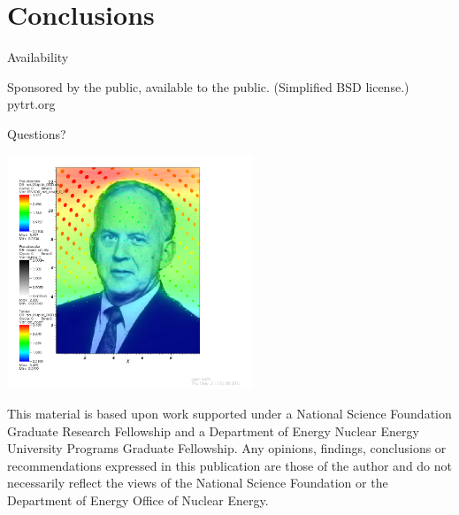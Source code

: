 \documentclass{beamer}
\begin{document}
\section{Conclusions}
\begin{frame}{Availability}

\begin{center}
Sponsored by the public, available to the public. (Simplified BSD license.)
\vspace{.5in}
  \Huge pytrt.org
\end{center}

\end{frame}

\begin{frame}{Questions?}

{\centering\includegraphics[height=2.75in]{larsen}\par}
\vspace{-\baselineskip}
{\setlength{\baselineskip}{-\baselineskip} \tiny 
This material is based upon work supported under a National Science Foundation
Graduate Research Fellowship and a Department of Energy Nuclear Energy
University Programs Graduate Fellowship. Any opinions, findings, conclusions or
recommendations expressed in this publication are those of the author and do
not necessarily reflect the views of the National Science Foundation or the
Department of Energy Office of Nuclear Energy.\par}
\end{frame}


\end{document}
